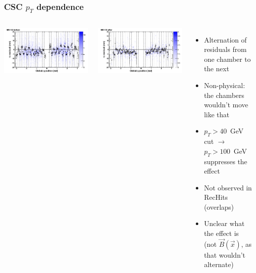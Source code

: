 \documentclass[compress]{beamer}
\begin{document}
\begin{frame}
\frametitle{CSC $p_T$ dependence}
\begin{columns}
\includegraphics[width=\linewidth]{wasitthepropagator_before.png}

\includegraphics[width=\linewidth]{wasitthepropagator_after.png}
\begin{itemize}
\item Alternation of residuals from one chamber to the next

\item Non-physical: the chambers wouldn't move like that

\item $p_T > 40$~GeV cut $\to$ $p_T > 100$~GeV suppresses the effect

\item Not observed in RecHits (overlaps)

\item Unclear what the effect is (not $\vec{B}(\vec{x})$, as that wouldn't alternate)
\end{itemize}
\end{columns}
\end{frame}
\end{document}

